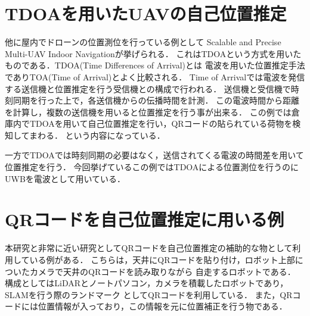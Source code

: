 \section{TDOAを用いたUAVの自己位置推定}
他に屋内でドローンの位置測位を行っている例として
Scalable and Precise Multi-UAV Indoor Navigation\cite{TDOA-UWB}が挙げられる．
これはTDOAという方式を用いたものである．TDOA(Time Differences of Arrival)とは
電波を用いた位置推定手法でありTOA(Time of Arrival)とよく比較される．
Time of Arrivalでは電波を発信する送信機と位置推定を行う受信機との構成で行われる．
送信機と受信機で時刻同期を行った上で，各送信機からの伝播時間を計測．
この電波時間から距離を計算し，複数の送信機を用いると位置推定を行う事が出来る．
この例では倉庫内でTDOAを用いて自己位置推定を行い，QRコードの貼られている荷物を検知してまわる．
という内容になっている．

一方でTDOAでは時刻同期の必要はなく，送信されてくる電波の時間差を用いて位置推定を行う．
今回挙げているこの例ではTDOAによる位置測位を行うのにUWBを電波として用いている．

\section{QRコードを自己位置推定に用いる例}
本研究と非常に近い研究としてQRコードを自己位置推定の補助的な物として利用している例がある\cite{qrrobot}．
こちらは，天井にQRコードを貼り付け，ロボット上部についたカメラで天井のQRコードを読み取りながら
自走するロボットである．
構成としてはLiDARとノートパソコン，カメラを積載したロボットであり，SLAMを行う際のランドマーク
としてQRコードを利用している．
また，QRコードには位置情報が入っており，この情報を元に位置補正を行う物である．

